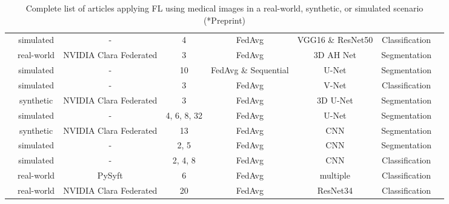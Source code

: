 \begin{sidewaystable}
\begin{tabular}{cccccccc}
    \cite{Feki2021FederatedImages}                      & simulated  & -                        & 4             & FedAvg                    & VGG16 \& ResNet50 & Classification \\    
    \cite{Sarma2021FederatedSharing}                    & real-world & NVIDIA Clara Federated   & 3             & FedAvg                    & 3D AH Net         & Segmentation \\
    \cite{Sheller2020FederatedData}                     & simulated  & -                        & 10            & FedAvg \& Sequential      & U-Net             & Segmentation \\
    \cite{Baheti2020FederatedNodules}                   & simulated  & -                        & 3             & FedAvg                    & V-Net             & Classification \\    
    \cite{Yang2021FederatedJapan}                       & synthetic  & NVIDIA Clara Federated   & 3             & FedAvg                    & 3D U-Net          & Segmentation \\  
    \cite{Sheller2019Multi-institutionalSegmentation}   & simulated  & -                        & 4, 6, 8, 32   & FedAvg                    & U-Net             & Segmentation \\
    \cite{Li2019Privacy-preservingSegmentation}         & synthetic  & NVIDIA Clara Federated   & 13            & FedAvg                    & CNN               & Segmentation \\
    \cite{Andreux2020SiloedDatasets}                    & simulated  & -                        & 2, 5          & FedAvg                    & CNN               & Segmentation \\
    \cite{Yan2020Variation-AwareData}                   & simulated  & -                        & 2, 4, 8       & FedAvg                    & CNN               & Classification \\
    \cite{Lee2021FederatedEnvironment}                  & real-world & PySyft                   & 6             & FedAvg                    & multiple          & Classification \\
    \cite{Flores2021FederatedPatients}\rlap{*}          & real-world & NVIDIA Clara Federated   & 20            & FedAvg                    & ResNet34          & Classification \\
  \end{tabular}
  \caption{Complete list of articles applying FL using medical images in a real-world, synthetic, or simulated scenario (*Preprint)}
  \label{tab:LitSearchFull}
\end{sidewaystable}



